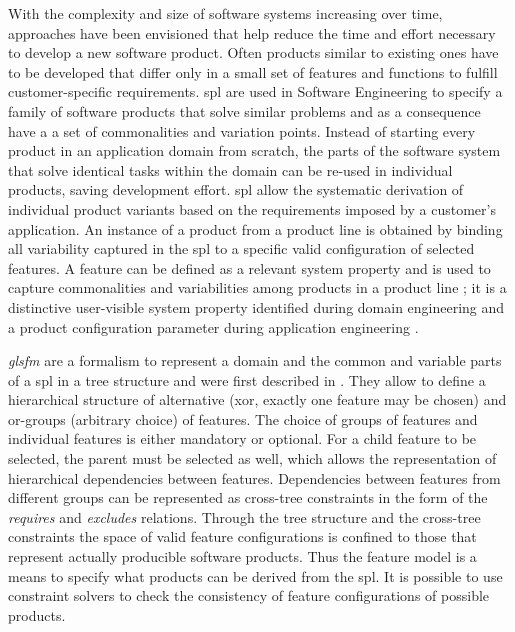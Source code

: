 With the complexity and size of software systems increasing over time, approaches have been envisioned that help reduce the time and effort necessary to develop a new software product. Often products similar to existing ones have to be developed that differ only in a small set of features and functions to fulfill customer-specific requirements.
\Gls{spl} are used in Software Engineering to specify a family of software products that solve similar problems and as a consequence have a a set of commonalities and variation points. Instead of starting every product in an application domain from scratch, the parts of the software system that solve identical tasks within the domain can be re-used in individual products, saving development effort. 
\Gls{spl} allow the systematic derivation of individual product variants based on the requirements imposed by a customer's application. 
An instance of a product from a product line is obtained by binding all variability captured in the \gls{spl} to a specific valid configuration of selected features.
A feature can be defined as a relevant system property and is used to capture commonalities and variabilities among products in a product line \cite{Fernandes2008}; it is a distinctive user-visible system property identified during domain engineering and a product configuration parameter during application engineering \cite{Saller2013}.

\textit{gls{fm}} are a formalism to represent a domain and the common and variable parts of a \Gls{spl} in a tree structure and were first described in \cite{Kang1990}. They allow to define a hierarchical structure of alternative (xor, exactly one feature may be chosen) and or-groups (arbitrary choice) of features. The choice of groups of features and individual features is either mandatory or optional. For a child feature to be selected, the parent must be selected as well, which allows the representation of hierarchical dependencies between features. Dependencies between features from different groups can be represented as cross-tree constraints in the form of the \textit{requires} and \textit{excludes} relations. Through the tree structure and the cross-tree constraints the space of valid feature configurations is confined to those that represent actually producible software products. Thus the feature model is a means to specify what products can be derived from the \gls{spl}.
It is possible to use constraint solvers to check the consistency of feature configurations of possible products.

